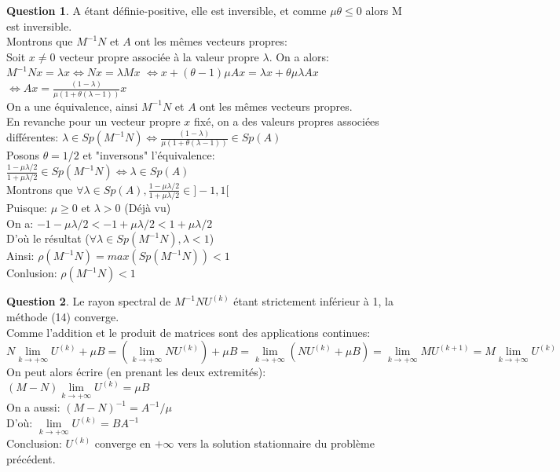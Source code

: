 \documentclass[a4paper]{article}
\theoremstyle{definition}
\newtheorem{que}{Question}
\begin{document}
	\begin{que}
		A étant définie-positive, elle est inversible, et comme $\mu \theta \leq 0$ alors M est inversible. \\
		Montrons que $M^{-1}N$ et $A$ ont les mêmes vecteurs propres: \\
		Soit $x \neq 0$ vecteur propre associée à la valeur propre $\lambda$.
		On a alors: \\
		$M^{-1}Nx=\lambda x \Leftrightarrow Nx=\lambda Mx$
		$\Leftrightarrow x +(\theta - 1) \mu A x = \lambda x + \theta \mu \lambda Ax$
		$\Leftrightarrow  Ax = \frac{(1 - \lambda)}{\mu(1+\theta(\lambda - 1))} x$ \\
		On a une équivalence, ainsi $M^{-1}N$ et $A$ ont les mêmes vecteurs propres.\\
		En revanche pour un vecteur propre $x$ fixé, on a des valeurs propres associées différentes: $\lambda \in Sp(M^{-1}N) \Leftrightarrow \frac{(1 - \lambda)}{\mu(1+\theta(\lambda - 1))} \in Sp(A)$ \\

		Posons $\theta = 1/2$ et "inversons" l'équivalence: \\
		$\frac{1 - \mu \lambda / 2}{1 + \mu \lambda / 2} \in Sp(M^{-1}N) \Leftrightarrow \lambda \in Sp(A)$ \\

		Montrons que $\forall \lambda \in Sp(A), \frac{1 - \mu \lambda / 2}{1 + \mu \lambda / 2} \in ]-1, 1[$ \\
		Puisque: $\mu \ge 0$ et $\lambda > 0$ (Déjà vu) \\
		On a: $ -1 -\mu \lambda/2 < -1 + \mu \lambda / 2 < 1 +\mu \lambda / 2$ \\
		D'où le résultat ($\forall \lambda \in Sp(M^{-1}N), \lambda < 1$) \\

		Ainsi: $\rho(M^{-1}N) = max(Sp(M^{-1}N)) < 1$ \\
		Conlusion: $\rho(M^{-1}N) < 1$
	\end{que}
	\begin{que}
		Le rayon spectral de $M^{-1}N U^{(k)}$ étant strictement inférieur à 1, la méthode (14) converge. \\

		Comme l'addition et le produit de matrices sont des applications continues: \\
		$N\lim\limits_{k \to +\infty} U^{(k)} + \mu B = (\lim\limits_{k \to +\infty} NU^{(k)}) + \mu B = \lim\limits_{k \to +\infty} (NU^{(k)} + \mu B) = \lim\limits_{k \to +\infty} MU^{(k+1)} = M\lim\limits_{k \to +\infty} U^{(k)}$ \\
		On peut alors écrire (en prenant les deux extremités): $(M-N) \lim\limits_{k \to +\infty} U^{(k)}=\mu B$ \\

		On a aussi: $(M-N)^{-1} = A^{-1} / \mu$ \\
		D'où: $\lim\limits_{k \to +\infty} U^{(k)} = BA^{-1}$ \\
		Conclusion: $U^{(k)}$ converge en $+\infty$ vers la solution stationnaire du problème précédent.
	\end{que}
\end{document}
